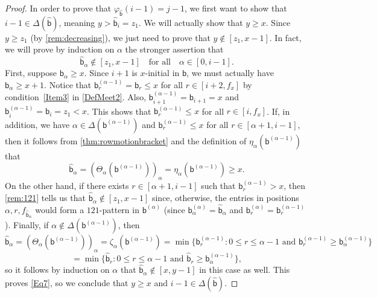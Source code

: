 \documentclass[11pt]{amsart}
\theoremstyle{definition}
\begin{document}
\begin{proof}
In order to prove that $\varphi_{\widehat{\mathsf b}}(i-1)=j-1$, we first want to show that $i-1\in\Delta(\widehat{\mathsf b})$, meaning $y>\widehat{\mathsf b}_i=z_1$. We will actually show that $y\geq x$. Since $y\geq z_1$ (by \cref{rem:decreasing}), we just need to prove that $y\not\in[z_1,x-1]$. In fact, we will prove by induction on $\alpha$ the stronger assertion that \begin{equation}\label{Eq7}
\widehat{\mathsf b}_\alpha\not\in[z_1,x-1]\quad\text{for all}\quad \alpha\in[0,i-1].    
\end{equation} 
First, suppose $\mathsf b_\alpha\geq x$. Since $i+1$ is $x$-initial in $\mathsf b$, we must actually have $\mathsf b_\alpha\geq x+1$. Notice that $\mathsf b^{(\alpha-1)}_r=\mathsf b_r\leq x$ for all $r\in[i+2,f_x]$ by condition~\eqref{Item3} in \cref{DefMeet2}. Also, $\mathsf b_{i+1}^{(\alpha-1)}=\mathsf b_{i+1}=x$ and $\mathsf b^{(\alpha-1)}_i=\mathsf b_i=z_1<x$. This shows that $\mathsf b_r^{(\alpha-1)}\leq x$ for all $r\in[i,f_x]$. If, in addition, we have $\alpha\in\Delta(\mathsf b^{(\alpha-1)})$ and $\mathsf b^{(\alpha-1)}_r\leq x$ for all $r\in[\alpha+1,i-1]$, then it follows from \cref{thm:rowmotionbracket} and the definition of $\eta_\alpha(\mathsf b^{(\alpha-1)})$ that \[\widehat{\mathsf b}_\alpha=(\Theta_\alpha(\mathsf b^{(\alpha-1)}))_\alpha=\eta_\alpha(\mathsf b^{(\alpha-1)})\geq x.\] On the other hand, if there exists $r\in[\alpha+1,i-1]$ such that $\mathsf b_r^{(\alpha-1)}>x$, then \cref{rem:121} tells us that $\widehat{\mathsf b}_{\alpha}\not\in[z_1,x-1]$ since, otherwise, the entries in positions $\alpha,r,f_{\widehat{\mathsf b}_{\alpha}}$ would form a $121$-pattern in $\mathsf b^{(\alpha)}$ (since $\mathsf b_\alpha^{(\alpha)}=\widehat{\mathsf b}_\alpha$ and $\mathsf b^{(\alpha)}_r=\mathsf b_r^{(\alpha-1)}$). Finally, if $\alpha\not\in\Delta(\mathsf b^{(\alpha-1)})$, then \[\widehat{\mathsf b}_\alpha=(\Theta_\alpha(\mathsf b^{(\alpha-1)}))_\alpha=\zeta_\alpha(\mathsf b^{(\alpha-1)})=\min\{\mathsf b_r^{(\alpha-1)}:0\leq r\leq \alpha-1\text{ and }\mathsf b_r^{(\alpha-1)}\geq \mathsf b_\alpha^{(\alpha-1)}\}\] \[=\min\{\widehat{\mathsf b}_r:0\leq r\leq \alpha-1\text{ and }\widehat{\mathsf b}_r\geq \mathsf b_\alpha^{(\alpha-1)}\},\] so it follows by induction on $\alpha$ that $\widehat{\mathsf b}_\alpha\not\in[x,y-1]$ in this case as well. This proves \eqref{Eq7}, so we conclude that $y\geq x$ and $i-1\in\Delta(\widehat{\mathsf b})$.


\end{proof}
\end{document}
